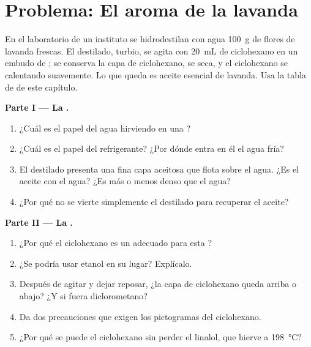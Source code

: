 \clearpage %
\section{Problema: El aroma de la lavanda}

\begin{problem}
\label{pb:g10:chemical-species:1}
En el laboratorio de un instituto se hidrodestilan con agua \qty{100}{g}
de flores de lavanda frescas. El destilado, turbio, se agita con
\qty{20}{mL} de ciclohexano en un embudo de ; se conserva la
capa de ciclohexano, se seca, y el ciclohexano se  calentando
suavemente. Lo que queda es aceite esencial de lavanda. Usa la tabla de
 de este capítulo.

\medskip
\noindent\textbf{Parte I --- La .}
\begin{enumerate}
  \item ¿Cuál es el papel del agua hirviendo en una ?
  \item ¿Cuál es el papel del refrigerante? ¿Por dónde entra en él el
        agua fría?
  \item El destilado presenta una fina capa aceitosa que flota sobre el
        agua. ¿Es el aceite  con el agua? ¿Es más o menos denso
        que el agua?
  \item ¿Por qué no se vierte simplemente el destilado para recuperar el
        aceite?
\end{enumerate}

\medskip
\noindent\textbf{Parte II --- La .}
\begin{enumerate}[resume]
  \item ¿Por qué el ciclohexano es un  adecuado para esta
        ?
  \item ¿Se podría usar etanol en su lugar? Explícalo.
  \item Después de agitar y dejar reposar, ¿la capa de ciclohexano queda
        arriba o abajo? ¿Y si fuera diclorometano?
  \item Da dos precauciones que exigen los pictogramas del ciclohexano.
  \item ¿Por qué se puede  el ciclohexano sin perder el linalol, que hierve a \qty{198}{\celsius}?
\end{enumerate}


\end{problem}
